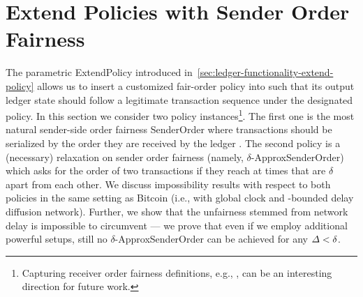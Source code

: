\section{Extend Policies with Sender Order Fairness}
\label{sec:extend-policies-with-order-fairness}

The parametric \textsf{ExtendPolicy} introduced in~\cref{sec:ledger-functionality-extend-policy} allows us to insert a customized fair-order policy into \funcFairLedger such that its output ledger state should follow a legitimate transaction sequence under the designated policy.
%
In this section we consider two policy instances\footnote{Capturing receiver order fairness definitions, e.g., \cite{C:KZGJ20,FC:CMSZ22}, can be an interesting direction for future work.}.
%
The first one is the most natural sender-side order fairness \textsf{SenderOrder} where transactions should be serialized by the order they are received by the ledger \funcFairLedger.
%
The second policy is a (necessary) relaxation on sender order fairness (namely, $\delta$-\textsf{ApproxSenderOrder}) which asks for the order of two transactions if they reach \funcFairLedger at times that are $\delta$ apart from each other.
%
We discuss impossibility results with respect to both policies in the same setting as Bitcoin (i.e., with global clock and \delay-bounded delay diffusion network).
%
Further, we show that the unfairness stemmed from network delay is impossible to circumvent --- we prove that even if we employ additional powerful setups, still no $\delta$-\textsf{ApproxSenderOrder} can be achieved for any $\varDelta < \delta$.



